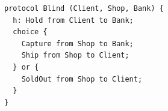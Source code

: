 \begin{lstlisting}[language={},basicstyle=\ttfamily\footnotesize,breaklines=true]
protocol Blind (Client, Shop, Bank) {
  h: Hold from Client to Bank;
  choice {
    Capture from Shop to Bank;
    Ship from Shop to Client;
  } or {
    SoldOut from Shop to Client;
  }
}
\end{lstlisting}
